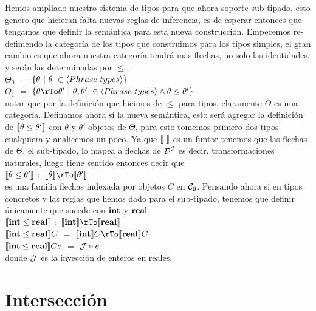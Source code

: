 Hemos ampliado nuestro sistema de tipos para que ahora soporte sub-tipado, 
esto genero que hicieran falta nuevas reglas de inferencia, es de esperar
entonces que tengamos que definir la sem\'antica para esta nueva construcci\'on.
Empecemos re-definiendo la categor\'ia de los tipos que construimos para los
tipos simples, el gran cambio es que ahora nuestra categor\'ia tendr\'a mas
flechas, no solo las identidades, y ser\'an las determinadas por $\leq$,\\

\noindent $\Theta_0$ $=$ $\{\theta \ | \ \theta \ \in \langle Phrase \ types \rangle \}$\\
$\Theta_1$ $=$ $\{\theta \rTo \theta' \ | \ \theta,\theta' \ \in \lrangles{Phrase \ types} \wedge \theta \leq \theta' \}$\\

\noindent
notar que por la definici\'on que hicimos de $\leq$ para tipos, claramente 
$\Theta$ es una categor\'ia. Definamos ahora s\'i la nueva sem\'antica, esto 
ser\'a agregar la definici\'on de $\llbracket \theta \leq \theta' \rrbracket$ con
$\theta$ y $\theta'$ objetos de $\Theta$, para esto tomemos primero dos 
tipos cualquiera y analicemos un poco. Ya que $\llbracket  \  \rrbracket$ es un funtor
tenemos que las flechas de $\Theta$, el sub-tipado, lo mapea a flechas de ${\mathcal{D}}^{\mathcal{C}}$
es decir, transformaciones naturales, luego tiene sentido entonces decir que\\

\noindent
$\llbracket \theta \leq \theta' \rrbracket$ $:$ $\semBrcks{\theta} \rTo \semBrcks{\theta'}$\\

\noindent
es una familia flechas indexada por objetos $C$ en $\mathcal{C}_0$. Pensando ahora si en
tipos concretos y las reglas que hemos dado para el sub-tipado, tenemos que definir
\'unicamente que sucede con $\textbf{int}$ y $\textbf{real}$.\\

\noindent
$\llbracket \textbf{int} \leq \textbf{real} \rrbracket$ $:$ $\semBrcks{\intt} \rTo \semBrcks{\realt}$\\
$\llbracket \textbf{int} \leq \textbf{real} \rrbracket C$ $=$ $\semBrcks{\intt}C \rTo \semBrcks{\realt}C$\\
$\llbracket \textbf{int} \leq \textbf{real} \rrbracket Ce$ $=$ $\mathcal{J} \circ e$ \\

\noindent
donde $\mathcal{J}$ es la inyecci\'on de enteros en reales.

\section{Intersecci\'on}


